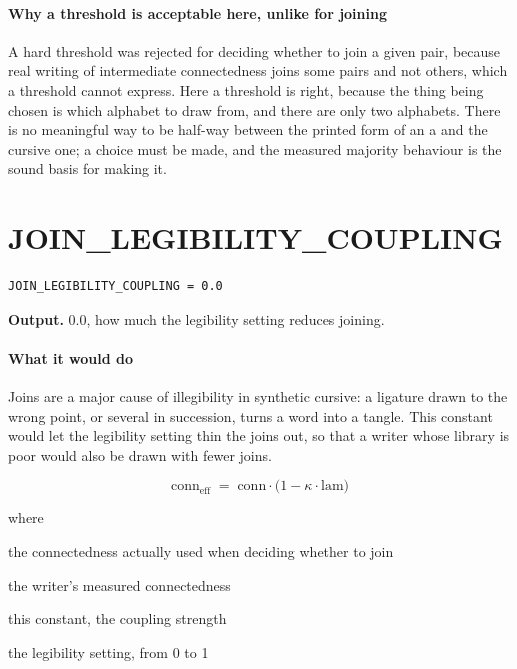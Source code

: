 \paragraph{Why a threshold is acceptable here, unlike for joining}
A hard threshold was rejected for deciding whether to join a given pair, because real writing of intermediate connectedness joins some pairs and not others, which a threshold cannot express. Here a threshold is right, because the thing being chosen is which alphabet to draw from, and there are only two alphabets. There is no meaningful way to be half-way between the printed form of an a and the cursive one; a choice must be made, and the measured majority behaviour is the sound basis for making it.


\section{JOIN\_LEGIBILITY\_COUPLING}
\begin{lstlisting}[style=sig]
JOIN_LEGIBILITY_COUPLING = 0.0
\end{lstlisting}

\noindent\textbf{Output.} 0.0, how much the legibility setting reduces joining.


\paragraph{What it would do}
Joins are a major cause of illegibility in synthetic cursive: a ligature drawn to the wrong point, or several in succession, turns a word into a tangle. This constant would let the legibility setting thin the joins out, so that a writer whose library is poor would also be drawn with fewer joins.


\begin{equation}
\mathrm{conn}_{\mathrm{eff}} \;=\; \mathrm{conn} \cdot \big(1 - \kappa \cdot \mathrm{lam}\big)
\end{equation}

\noindent where
\begin{description}[leftmargin=2.4em,style=nextline,font=\normalfont\ttfamily]\setlength\itemsep{1pt}
  \item[{$\mathrm{conn}_{\mathrm{eff}}$}] \normalfont the connectedness actually used when deciding whether to join
  \item[{$\mathrm{conn}$}] \normalfont the writer's measured connectedness
  \item[{$\kappa$}] \normalfont this constant, the coupling strength
  \item[{$\mathrm{lam}$}] \normalfont the legibility setting, from 0 to 1
\end{description}

